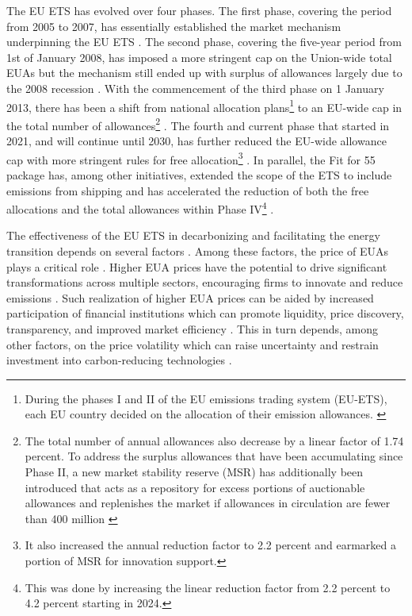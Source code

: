\documentclass[preprint, 3p,
authoryear]{elsarticle} %
\begin{document}
The EU ETS has evolved over four phases. The first phase, covering the
period from 2005 to 2007, has essentially established the market
mechanism underpinning the EU ETS \citep[Art. 11(1)]{directive_2003_87}.
The second phase, covering the five-year period from 1st of January
2008, has imposed a more stringent cap on the Union-wide total EUAs but
the mechanism still ended up with surplus of allowances largely due to
the 2008 recession \citep{ellerman_eu_2014, bel_emission_2015}. With the
commencement of the third phase on 1 January 2013, there has been a
shift from national allocation
plans\footnote{During the phases I and II of the EU emissions trading system (EU-ETS), each EU country decided on the allocation of their emission allowances. \citep[Art. 11]{directive_2003_87}}
to an EU-wide cap in the total number of
allowances\footnote{The total number of annual allowances also decrease by a linear factor of 1.74 percent. To address the surplus allowances that have been accumulating since Phase II, a new market stability reserve (MSR) has additionally been introduced that acts as a repository for excess portions of auctionable allowances and replenishes the market if allowances in circulation are fewer than 400 million \citep{decision_2015_1814, simoes_revision_2022}}
\citep[Art. 1]{directive_2009_29}. The fourth and current phase that
started in 2021, and will continue until 2030, has further reduced the
EU-wide allowance cap with more stringent rules for free
allocation\footnote{It also increased the annual reduction factor to 2.2 percent and earmarked a portion of MSR for innovation support.}
\citep{directive_2018_410}. In parallel, the Fit for 55 package has,
among other initiatives, extended the scope of the ETS to include
emissions from shipping and has accelerated the reduction of both the
free allocations and the total allowances within Phase
IV\footnote{This was done by increasing the linear reduction factor from 2.2 percent to 4.2 percent starting in 2024.}
\citep{directive_2023_959}.

The effectiveness of the EU ETS in decarbonizing and facilitating the
energy transition depends on several factors
\citep{backe_exploring_2023, de_cara_marginal_2011, marin_impact_2018, scheelhaase_options_2021}.
Among these factors, the price of EUAs plays a critical role
\citep{pietzcker_tightening_2021, quemin_raising_2022, lovcha_determinants_2022}.
Higher EUA prices have the potential to drive significant
transformations across multiple sectors, encouraging firms to innovate
and reduce emissions \citep{pietzcker_tightening_2021, recka_2015}. Such
realization of higher EUA prices can be aided by increased participation
of financial institutions which can promote liquidity, price discovery,
transparency, and improved market efficiency
\citep{bohl_impact_2023, corgnet_information_2021}. This in turn
depends, among other factors, on the price volatility which can raise
uncertainty and restrain investment into carbon-reducing technologies
\citep{acworth_emissions_2017, laing_assessing_2013}.
\end{document}
